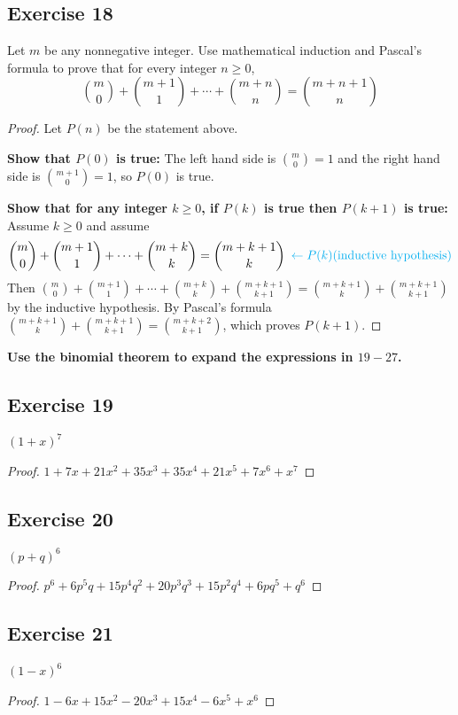 \documentclass[14pt]{extarticle}
\newcommand{\from}{\leftarrow}
\newcommand{\cy}{\color{cyan}}
\begin{document}
\subsection{Exercise 18}
Let \(m\) be any nonnegative integer. Use mathematical induction and Pascal’s formula to prove that for every integer
\(n \geq 0\),
\[
     \binom{m}{0} + \binom{m+1}{1} + \cdots + \binom{m+n}{n} = \binom{m+n+1}{n}
\]
\begin{proof}
     Let \(P(n)\) be the statement above.

          {\bf Show that \(P(0)\) is true:} The left hand side is \(\binom{m}{0} = 1\) and the right hand side is \(\binom{m+1}
     {0} = 1\), so \(P(0)\) is true.

          {\bf Show that for any integer \(k \geq 0\), if \(P(k)\) is true then \(P(k+1)\) is true:} Assume \(k \geq 0\) and assume
     \[
          \binom{m}{0} + \binom{m+1}{1} + \cdots + \binom{m+k}{k} = \binom{m+k+1}{k} \,\,\, {\cy \from P(k) \text{(inductive hypothesis)}}
     \]
     Then \(\binom{m}{0} + \binom{m+1}{1} + \cdots + \binom{m+k}{k}+ \binom{m+k+1}{k+1} = \binom{m+k+1}{k} + \binom{m+k+1}{k+1}\)
     by the inductive hypothesis. By Pascal's formula \(\binom{m+k+1}{k} + \binom{m+k+1}{k+1} = \binom{m+k+2}{k+1}\),
     which proves \(P(k+1)\).
\end{proof}

{\bf \cy Use the binomial theorem to expand the expressions in \(19-27\).}

\subsection{Exercise 19}
\((1+x)^7\)
\begin{proof}
     \(1 + 7x + 21x^2 + 35x^3 + 35x^4 + 21x^5 + 7x^6 + x^7\)
\end{proof}

\subsection{Exercise 20}
\((p+q)^6\)
\begin{proof}
     \(p^6 + 6p^5q + 15p^4q^2 + 20p^3q^3 + 15p^2q^4 + 6pq^5 + q^6\)
\end{proof}

\subsection{Exercise 21}
\((1-x)^6\)
\begin{proof}
     \(1 - 6x + 15x^2 - 20x^3 + 15x^4 - 6x^5 + x^6\)
\end{proof}
\end{document}
